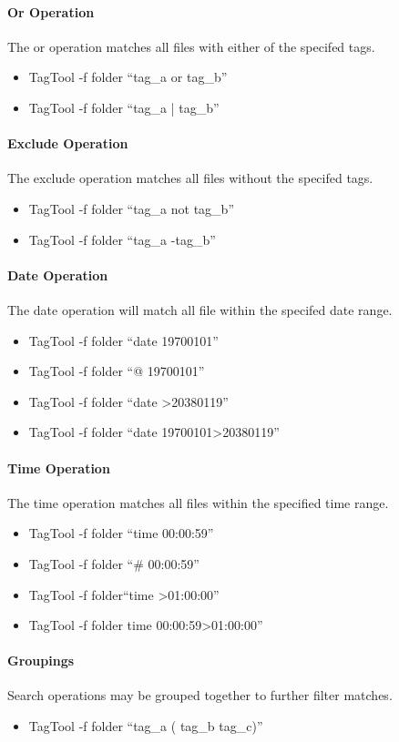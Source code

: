 \documentclass[12pt]{article}
\begin{document}
\paragraph{Or Operation} The or operation matches all files with either of the specifed tags.
\begin{itemize}
    \item TagTool -f folder ``tag\_a or tag\_b''
    \item TagTool -f folder ``tag\_a | tag\_b''
\end{itemize}
\paragraph{Exclude Operation} The exclude operation matches all files without the specifed tags.
\begin{itemize}
    \item TagTool -f folder ``tag\_a not tag\_b''
    \item TagTool -f folder ``tag\_a -tag\_b''
\end{itemize}
\paragraph{Date Operation} The date operation will match all file within the specifed date range.
\begin{itemize}
    \item TagTool -f folder ``date 19700101''
    \item TagTool -f folder ``@ 19700101''
    \item TagTool -f folder ``date >20380119''
    \item TagTool -f folder ``date 19700101>20380119''
\end{itemize}
\paragraph{Time Operation} The time operation matches all files within the specified time range.
\begin{itemize}
    \item TagTool -f folder ``time 00:00:59''
    \item TagTool -f folder ``\# 00:00:59''
    \item TagTool -f folder``time >01:00:00''
    \item TagTool -f folder time 00:00:59>01:00:00''
\end{itemize}
\paragraph{Groupings} Search operations may be grouped together to further filter matches.
\begin{itemize}
    \item TagTool -f folder ``tag\_a ( tag\_b tag\_c)''
\end{itemize}
\end{document}
